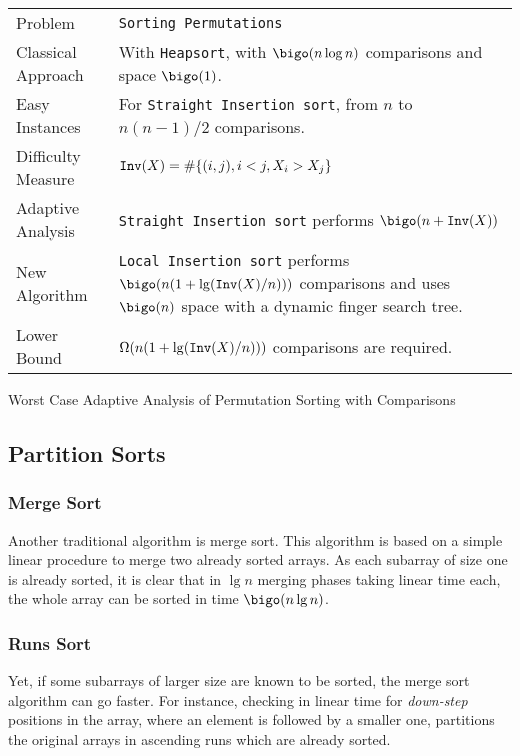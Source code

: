 \begin{adaptiveanalysis}[e]
  \begin{tabular}{@{\bf}p{}p{}}
    Problem            & {\tt Sorting Permutations}\\               
    Classical Approach & With {\tt Heapsort}, with $\bigo(n\log n)$ comparisons and space $\bigo(1)$. \\
    Easy Instances     & For {\tt Straight Insertion sort}, from $n$ to $n(n-1)/2$ comparisons.\\
    Difficulty Measure & $\mathtt{Inv}(X)=\#\{(i,j), i<j, X_i > X_j\}$\\
    Adaptive Analysis  & {\tt Straight Insertion sort} performs $\bigo( n + \idtt{Inv}(X) ) $ \\
    New Algorithm      & {\tt Local Insertion sort} performs $\bigo( n ( 1 + \lg( \idtt{Inv}(X) / n ) ) )$ comparisons 
    and uses $\bigo(n)$ space with a dynamic finger search tree. \\
    Lower Bound        & $\Omega( n ( 1 + \lg( \mathtt{Inv}(X) / n ) ) )$ comparisons are required. \\
  \end{tabular}
  \caption{Worst Case Adaptive Analysis of Permutation Sorting with
    Comparisons}
  \label{tab:permutationSortingWorstCase}
\end{adaptiveanalysis}


\subsection{Partition Sorts}
\label{sec:partition-sorts}

\subsubsection{Merge Sort}
\label{sec:merge-sort}

Another traditional algorithm is merge sort.
%
This algorithm is based on a simple linear procedure to merge two
already sorted arrays.
%
As each subarray of size one is already sorted, it is clear that in
$\lg n$ merging phases taking linear time each, the whole array can be
sorted in time $\bigo(n\lg n)$.

\subsubsection{Runs Sort}
\label{sec:runs-sort}

Yet, if some subarrays of larger size are known to be sorted, the
merge sort algorithm can go faster.
%
For instance, checking in linear time for \emph{down-step} positions
in the array, where an element is followed by a smaller one,
partitions the original arrays in ascending runs which are already
sorted.

